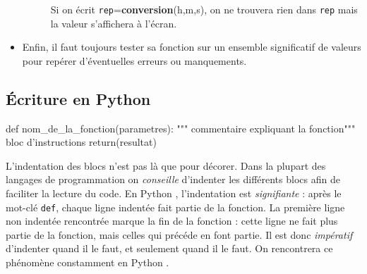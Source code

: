 \begin{rem}
\begin{itemize}
\begin{description}
Si on écrit \texttt{rep}=\textbf{conversion}(h,m,s), on  ne trouvera rien dans \texttt{rep} mais la 
valeur s'affichera à l'écran.
\end{description}



	\item Enfin, il faut toujours tester sa fonction sur un ensemble significatif de valeurs 
pour repérer d'éventuelles erreurs ou manquements.
\end{itemize}
\end{rem}

\subsection{\'Ecriture en Python }

\begin{pyconsole}
 def nom_de_la_fonction(parametres):
     """ commentaire expliquant la fonction"""
     bloc d'instructions
     return(resultat)
 
 
\end{pyconsole}

\begin{rem}
 L'indentation des blocs n'est pas là que pour décorer. Dans la plupart des langages de 
programmation on \emph{conseille} d'indenter les différents blocs afin de faciliter la lecture du 
code. En Python , l'indentation est \emph{signifiante} : après le mot-clé \texttt{def}, chaque 
ligne indentée fait partie de la fonction. La première ligne non indentée rencontrée marque la 
fin de la fonction : cette ligne ne fait plus partie de la fonction, mais celles qui précéde en 
font partie. Il est donc \emph{impératif} d'indenter quand il le faut, et seulement 
quand il le faut. On rencontrera ce phénomène constamment en Python .
\end{rem}
